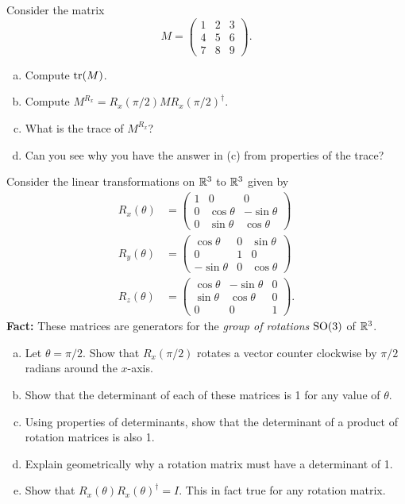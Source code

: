 \documentclass[12pt]{article} %
\begin{document}
\begin{problem}
Consider the matrix 
\[
M = \begin{pmatrix} 1 & 2 & 3 \\ 4 & 5 & 6 \\ 7 & 8 & 9 \end{pmatrix}.
\]
\begin{enumerate}[(a)]
    \item Compute $\mathrm{tr}(M)$. 
    \item Compute $M^{R_x}=R_x(\pi/2)MR_x(\pi/2)^\dagger$.
    \item What is the trace of $M^{R_x}$?
    \item Can you see why you have the answer in (c) from properties of the trace?
\end{enumerate}
\end{problem}

\begin{problem}
Consider the linear transformations on $\mathbb{R}^3$ to $\mathbb{R}^3$ given by
\begin{align*}
    R_x(\theta) &= \begin{pmatrix} 1 & 0 & 0 \\ 0 & \cos\theta & -\sin \theta \\ 0 & \sin\theta & \cos \theta \end{pmatrix}\\
    R_y(\theta) &= \begin{pmatrix} \cos \theta & 0 & \sin \theta \\ 0 & 1 & 0 \\ -\sin \theta & 0 & \cos \theta \end{pmatrix}\\
    R_z(\theta) &= \begin{pmatrix} \cos \theta & -\sin \theta & 0 \\ \sin \theta & \cos \theta  & 0 \\ 0 & 0 & 1 \end{pmatrix}.
\end{align*}
\textbf{Fact:} These matrices are generators for the \emph{group of rotations} $\mathrm{SO}(3)$ of $\mathbb{R}^3$.
\begin{enumerate}[(a)]
    \item Let $\theta = \pi/2$. Show that $R_x(\pi/2)$ rotates a vector counter clockwise by $\pi/2$ radians around the $x$-axis.
    \item Show that the determinant of each of these matrices is 1 for any value of $\theta$.
    \item Using properties of determinants, show that the determinant of a product of rotation matrices is also 1.
    \item Explain geometrically why a rotation matrix must have a determinant of 1.
    \item Show that $R_x(\theta)R_x(\theta)^\dagger = I$. This in fact true for any rotation matrix.
\end{enumerate}
\end{problem}
\end{document}
